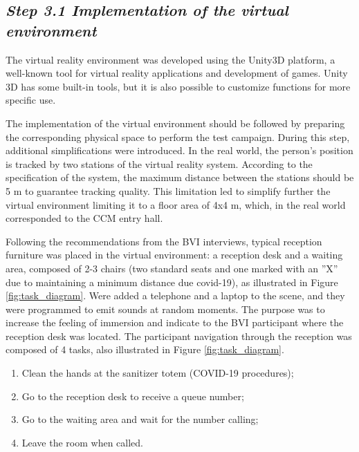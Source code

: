     \subsection*{\textit{Step 3.1 Implementation of the virtual environment}}
    \label{subsec:virtual_world_creation}

        The virtual reality environment was developed using the Unity3D platform, a well-known tool for virtual reality applications and development of games. Unity 3D has some built-in tools, but it is also possible to customize functions for more specific use\cite{wang2010new}.
    
        The implementation of the virtual environment should be followed by preparing the corresponding physical space to perform the test campaign. During this step, additional simplifications were introduced. In the real world, the person's position is tracked by two stations of the virtual reality system. According to the specification of the system, the maximum distance between the stations should be 5 m to guarantee tracking quality. This limitation led to simplify further the virtual environment limiting it to a floor area of 4x4 m, which, in the real world corresponded to the CCM entry hall. 
        
        Following the recommendations from the BVI interviews, typical reception furniture was placed in the virtual environment: a reception desk and a waiting area, composed of 2-3 chairs (two standard seats and one marked with an ”X” due to maintaining a minimum distance due covid-19), as illustrated in Figure \ref{fig:task_diagram}. Were added a telephone and a laptop to the scene, and they were programmed to emit sounds at random moments. The purpose was to increase the feeling of immersion and indicate to the BVI participant where the reception desk was located.
        The participant navigation through the reception was composed of 4 tasks, also illustrated in Figure \ref{fig:task_diagram}.
        
        \begin{enumerate}
            \item Clean the hands at the sanitizer totem (COVID-19 procedures);
            \item Go to the reception desk to receive a queue number;
            \item Go to the waiting area and wait for the number calling;
            \item Leave the room when called.
        \end{enumerate}
        
